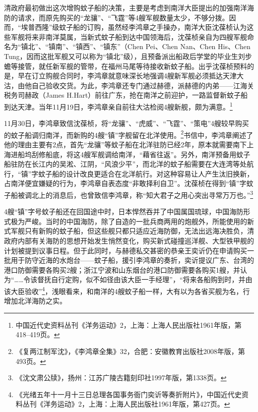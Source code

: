 \documentclass[12pt,UTF8]{ctexbook}
\begin{document}
清政府最初做出这次增购蚊子船的决策，主要是考虑到南洋大臣提出的加强南洋海防的请求，而原先购买的“龙骧”、“飞霆”等4艘军舰数量太少，不够分拨。因而，“埃普西隆”级蚊子船的订购，虽然经李鸿章之手操办，南洋大臣沈葆桢认为这些军舰将来非南洋莫属，当新式蚊子船到达中国领海后，沈葆桢亲自为四艘军舰命名为“镇北”、“镇南”、“镇西”、“镇东”（Chen Pei、Chen Nan、Chen His、Chen Tung，因而这批军舰又可以称为“镇北”级），且预备派出船政后学堂的毕业生刘步蟾等接管，就任新军舰的管带，在福州马尾等待接收新蚊子船。出乎沈葆桢预料的是，早在订立购舰合同时，李鸿章就意味深长地强调4艘新军舰必须抵达天津大沽，由他自己验收交货。为此，李鸿章还专门通过赫德，派赫德的内弟——江海关税务司赫政（James H.Hart）前往广东，抢在南洋之前迎护，一路监督新蚊子船到达天津。当年11月19日，李鸿章亲自前往大沽检阅4艘新舰，颇为满意。\footnote{中国近代史资料丛刊《洋务运动》2，上海：上海人民出版社1961年版，第418--419页。}

11月30日，李鸿章致信沈葆桢，将“龙骧”、“虎威”、“飞霆”、“策电”4艘较早购买的蚊子船调归南洋，而新购的4艘“镇”字舰留在北洋使用。\footnote{《复两江制军沈》，《李鸿章全集》32，合肥：安徽教育出版社2008年版，第493页。}书信中，李鸿章阐述了他的理由主要有2点，首先“龙骧”等蚊子船在北洋驻防已经2年，原本就需要南下上海进船坞刮修船底，将这4艘军舰调给南洋，“藉省往返”。另外，南洋预备用蚊子船驻防在长江内的吴淞、江阴，“风浪少平”，而北洋的蚊子船需要在大连湾等处航行，“镇”字蚊子船的设计改良更适合在北洋航行。对这种容易让人产生汰旧换新，占南洋便宜嫌疑的行为，李鸿章自表态度“非敢择利自卫”。沈葆桢在得到“镇”字蚊子船被调北上的消息后，也曾致信李鸿章，称“知大君子之用心突出寻常万万也。”\footnote{《沈文肃公牍》，扬州：江苏广陵古籍刻印社1997年版，第1338页。}

4艘“镇”字号蚊子船还在回国途中时，日本悍然吞并了中国属国琉球，中国海防形式极为严峻。当时的中国海防，除了自造的一批兵商两用的炮舰外，所能使用的新式军舰只有新购的蚊子船，但这些舰只都只适应近海防御，无法出远海决胜负，清政府内部有关海防的思想开始发生悄然变化，购买新式碰撞巡洋舰、大型铁甲舰的计划被提到议事日程。但于此同时，与赫德私交甚密的恭亲王奕䜣仍在申请购买一批用于防守近海的水炮台——蚊子船，援引李鸿章的奏折，奕䜣提议广东、台湾的港口防御需要各购买2艘；浙江宁波和山东烟台的港口防御需要各购买1艘，并认为“……令该督抚自行定购，似不如径由该大臣一手经理”，“将来各船购到时，并由该大臣验收”\footnote{《光绪五年十一月十三日总理各国事务衙门奕䜣等奏折附片》，中国近代史资料丛刊《洋务运动》2，上海：上海人民出版社1961年版，第427页。}，浅眼看来，和南洋的4艘蚊子船一样，大有以为各省买舰为名，行增加北洋海防之实。
\end{document}
